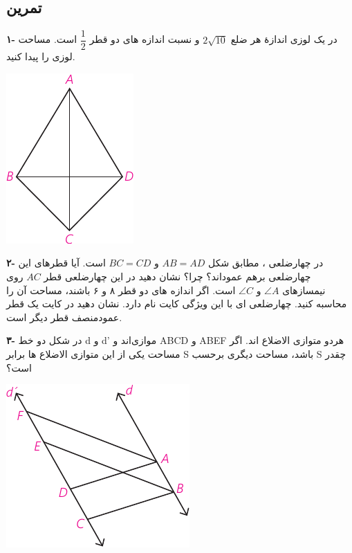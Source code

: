\documentclass[12pt, a4paper]{book}
\newenvironment{Figure}
{\par\medskip\noindent\minipage{\linewidth}}
{\endminipage\par\medskip}
\begin{document}
\newpage

\subsection{تمرین}
\begin{multicols}{2}


\textbf{۱- }در یک لوزی اندازهٔ هر ضلع 
$2\sqrt{10}$
و نسبت اندازه های دو قطر
$\dfrac12$
است. مساحت لوزی را پیدا کنید.

\begin{Figure}
	\centering
	\includegraphics[scale=1.2]{"Shapes/Fasl - 3/Dars 2/P72-S1.pdf"}
\end{Figure}

\bigskip

\textbf{۲-} در چهارضلعی
،
مطابق شکل 
$AB = AD$
و
$BC = CD$
است. آیا قطرهای این چهارضلعی برهم عموداند؟ چرا؟ نشان دهید در این چهارضلعی قطر 
$AC$
روی نیمسازهای
$\angle A$
و
$\angle C$
است. اگر اندازه های دو قطر ۸ و ۶ باشند، مساحت آن را محاسبه کنید. چهارضلعی ای با این ویژگی کایت نام دارد. نشان دهید در کایت یک قطر عمودمنصف قطر دیگر است.
\bigskip

\textbf{۳-}
در شکل دو خط d و d' موازی‌اند و ABCD و ABEF هردو متوازی الاضلاع اند. اگر مساحت یکی از این متوازی الاضلاع ها برابر S باشد، مساحت دیگری برحسب S چقدر است؟

\begin{Figure}
	\centering
	\includegraphics[scale=1.2]{"Shapes/Fasl - 3/Dars 2/P72-S2.pdf"}
\end{Figure}


\end{multicols}
\end{document}
